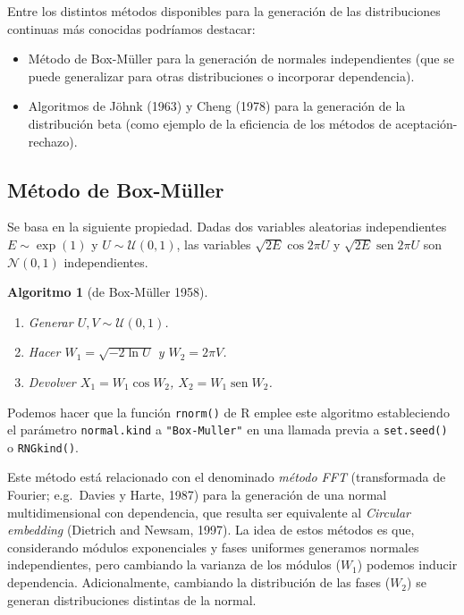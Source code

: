 \documentclass[
]{book}
\theoremstyle{break}
\newtheorem{conjecture}{Algoritmo}[chapter]
\theoremstyle{nonumberplain}
\begin{document}
Entre los distintos métodos disponibles para la generación de las distribuciones continuas más conocidas podríamos destacar:

\begin{itemize}
\item
  Método de Box-Müller para la generación de normales independientes (que se puede generalizar para otras distribuciones o incorporar dependencia).
\item
  Algoritmos de Jöhnk (1963) y Cheng (1978) para la generación de la distribución beta (como ejemplo de la eficiencia de los métodos de aceptación-rechazo).
\end{itemize}

\hypertarget{muxe9todo-de-box-muxfcller}{%
\subsection{Método de Box-Müller}\label{muxe9todo-de-box-muxfcller}}

Se basa en la siguiente propiedad. Dadas dos variables aleatorias independientes \(E \sim \exp\left( 1\right)\) y
\(U \sim \mathcal{U}( 0, 1 )\), las variables
\(\sqrt{2E} \cos 2\pi U\) y \(\sqrt{2E}\operatorname{sen} 2\pi U\) son
\(\mathcal{N}( 0, 1 )\) independientes.

\begin{conjecture}[de Box-Müller 1958]
\protect\hypertarget{cnj:box-muller}{}\label{cnj:box-muller}

\begin{enumerate}
\def\labelenumi{\arabic{enumi}.}
\item
  Generar \(U,V\sim \mathcal{U}(0, 1)\).
\item
  Hacer \(W_1=\sqrt{-2\ln U}\) y \(W_2=2\pi V\).
\item
  Devolver \(X_1=W_1\cos W_2\), \(X_2=W_1\operatorname{sen}W_2\).
\end{enumerate}

\end{conjecture}

Podemos hacer que la función \texttt{rnorm()} de R emplee este algoritmo estableciendo el parámetro \texttt{normal.kind} a \texttt{"Box-Muller"} en una llamada previa a \texttt{set.seed()} o \texttt{RNGkind()}.

Este método está relacionado con el denominado \emph{método FFT} (transformada de Fourier; e.g.~Davies y Harte, 1987) para la generación de una normal multidimensional con dependencia, que resulta ser equivalente al \emph{Circular embedding} (Dietrich and Newsam, 1997).
La idea de estos métodos es que, considerando módulos exponenciales y fases uniformes generamos normales independientes, pero cambiando la varianza de los módulos (\(W_1\)) podemos inducir dependencia.
Adicionalmente, cambiando la distribución de las fases (\(W_2\)) se generan distribuciones distintas de la normal.
\end{document}
